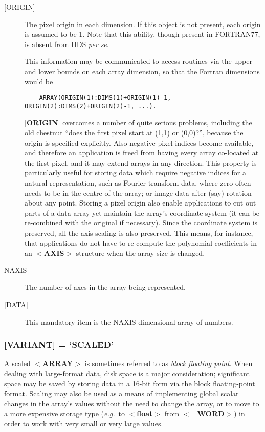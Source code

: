 \documentclass[twoside,11pt]{article}
\begin{document}
\begin{description}
\item [{[}ORIGIN{]}]
The pixel origin in each dimension.  If this object is not present,
each origin is assumed to be 1.  Note that this
ability, though present in FORTRAN77, is
absent from HDS {\it per se}.

This information may be communicated to 
access routines via the upper and lower bounds on each array dimension, 
so that the Fortran dimensions would be 
\begin{verbatim}
    ARRAY(ORIGIN(1):DIMS(1)+ORIGIN(1)-1, ORIGIN(2):DIMS(2)+ORIGIN(2)-1, ...).
\end{verbatim}

{[}{\bf ORIGIN}{]} overcomes a number of quite serious problems,
including the old chestnut ``does the first pixel start at (1,1) or
(0,0)?'', because the origin is specified explicitly. Also negative
pixel indices become available, and therefore an application is freed
from having every array co-located at the first pixel, and it may extend
arrays in any direction. This property is particularly useful for
storing data which require negative indices for a natural
representation, such as Fourier-transform data, where zero often needs to
be in the centre of the array; or image data after (say) rotation about
any point.  Storing a pixel origin also enable applications to cut out parts
of a data array yet maintain the array's coordinate system (it can be
re-combined with the original if necessary). Since the coordinate
system is preserved, all the axis scaling is also preserved. This means,
for instance, that applications do not have to re-compute the polynomial
coefficients in an $<${\bf AXIS}$>$ structure when the array size is
changed.
\item [NAXIS]
The number of axes in the array being represented.
\item [{[}DATA{]}]
This mandatory item is the NAXIS-dimensional array of numbers.
\end{description}

\subsubsection{{[}{\bf VARIANT}{]} = `SCALED'}
A scaled \mbox{$<${\bf ARRAY}$>$} is sometimes referred
to as {\it block floating point}. 
When dealing with large-format data, disk space is a major
consideration; significant space may be saved by storing data in a
16-bit form via the block floating-point format.  Scaling may also be
used as a means of implementing global scalar changes in the array's
values without the need to change the array, or to move to a more
expensive storage type ({\it e.g.}\  to $<${\bf float}$>$ from
$<${\bf \_WORD}$>$) in order to work with very small or very large values. 
\end{document}
